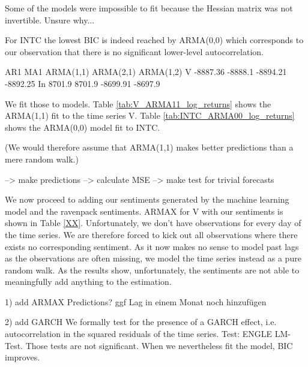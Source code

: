 Some of the models were impossible to fit because the Hessian matrix was not invertible. Unsure why...

For INTC the lowest BIC is indeed reached by ARMA(0,0) which corresponds to our observation that there is no significant lower-level autocorrelation. 

    AR1         MA1         ARMA(1,1)   ARMA(2,1)   ARMA(1,2)     
V   -8887.36    -8888.1     -8894.21    -8892.25 
In  8701.9      8701.9      -8699.91    -8697.9

We fit those to models. Table \ref{tab:V_ARMA11_log_returns} shows the ARMA(1,1) fit to the time series V. Table \ref{tab:INTC_ARMA00_log_returns} shows the ARMA(0,0) model fit to INTC. 

\begin{table}[h]
    \centering
    
    \caption{}
    \label{tab:V_ARMA11_log_returns}
\end{table}{}

\begin{table}[h]
    \centering
    
    \caption{}
    \label{tab:INTC_ARMA00_log_returns}
\end{table}{}

(We would therefore assume that ARMA(1,1) makes better predictions than a mere random walk.) 

--> make predictions
--> calculate MSE
--> make test for trivial forecasts

We now proceed to adding our sentiments generated by the machine learning model and the ravenpack sentiments. 
ARMAX for V with our sentiments is shown in Table \ref{XX}. 
Unfortunately, we don't have observations for every day of the time series. We are therefore forced to kick out all observations where there exists no corresponding sentiment. As it now makes no sense to model past lags as the observations are often missing, we model the time series instead as a pure random walk. As the results show, unfortunately, the sentiments are not able to meaningfully add anything to the estimation. 

1) add ARMAX Predictions?
ggf Lag in einem Monat noch hinzufügen


2) add GARCH
We formally test for the presence of a GARCH effect, i.e. autocorrelation in the squared residuals of the time series. Test: ENGLE LM-Test. Those tests are not significant. When we nevertheless fit the model, BIC improves. 



